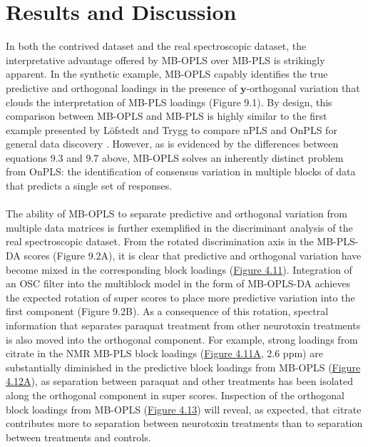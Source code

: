 \section{Results and Discussion}

\begin{doublespace}
In both the contrived dataset and the real spectroscopic dataset, the
interpretative advantage offered by MB-OPLS over MB-PLS is strikingly
apparent. In the synthetic example, MB-OPLS capably identifies the true
predictive and orthogonal loadings in the presence of $\mathbf{y}$-orthogonal
variation that clouds the interpretation of MB-PLS loadings (Figure 9.1). By
design, this comparison between MB-OPLS and MB-PLS is highly similar to the
first example presented by L\"{o}fstedt and Trygg to compare nPLS and OnPLS
for general data discovery \cite{lofstedt:jchemo2011}. However, as is
evidenced by the differences between equations 9.3 and 9.7 above, MB-OPLS
solves an inherently distinct problem from OnPLS: the identification of
consensus variation in multiple blocks of data that predicts a single set
of responses.
\\\\
The ability of MB-OPLS to separate predictive and orthogonal variation from
multiple data matrices is further exemplified in the discriminant analysis
of the real spectroscopic dataset. From the rotated discrimination axis in
the MB-PLS-DA scores (Figure 9.2A), it is clear that predictive and orthogonal
variation have become mixed in the corresponding block loadings
(\hyperref[figure.4.11]{Figure 4.11}).
Integration of an OSC filter into the multiblock model in the form of
MB-OPLS-DA achieves the expected rotation of super scores to place more
predictive variation into the first component (Figure 9.2B). As a consequence
of this rotation, spectral information that separates paraquat treatment from
other neurotoxin treatments is also moved into the orthogonal component. For
example, strong loadings from citrate in the \hnmr{} NMR MB-PLS block loadings
(\hyperref[figure.4.11]{Figure 4.11A}, 2.6 ppm) are substantially diminished
in the predictive block loadings from MB-OPLS
(\hyperref[figure.4.12]{Figure 4.12A}), as separation between paraquat and
other treatments has been isolated along the orthogonal component in super
scores. Inspection of the orthogonal block loadings from MB-OPLS
(\hyperref[figure.4.13]{Figure 4.13}) will reveal, as expected, that citrate
contributes more to separation between neurotoxin treatments than to
separation between treatments and controls.
\\\\

\end{doublespace}
